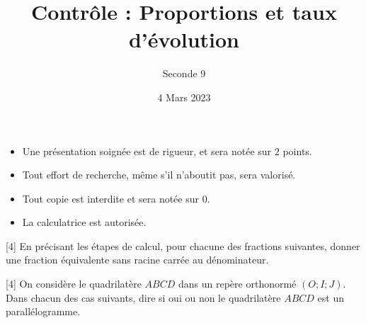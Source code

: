 \documentclass{exam}
\date{4 Mars 2023}
\author{Seconde 9}
\title{Contrôle : Proportions et taux d'évolution}
\begin{document}
\maketitle

\begin{itemize}
\item Une présentation soignée est de rigueur, et sera notée sur $2$ points.
\item Tout effort de recherche, même s'il n'aboutit pas, sera valorisé.
\item Tout copie est interdite et sera notée sur $0$.
\item La calculatrice est autorisée.
\end{itemize}
\vspace*{1cm}
\begin{questions}
[4]
En précisant les étapes de calcul, pour chacune des fractions suivantes, donner une fraction équivalente sans racine carrée au dénominateur.
\vspace*{0.5cm}
[4]
On considère le quadrilatère $ABCD$ dans un repère orthonormé $(O;I;J)$. Dans chacun des cas suivants, dire si oui ou non le quadrilatère $ABCD$ est un parallélogramme.
\end{questions}
\end{document}
